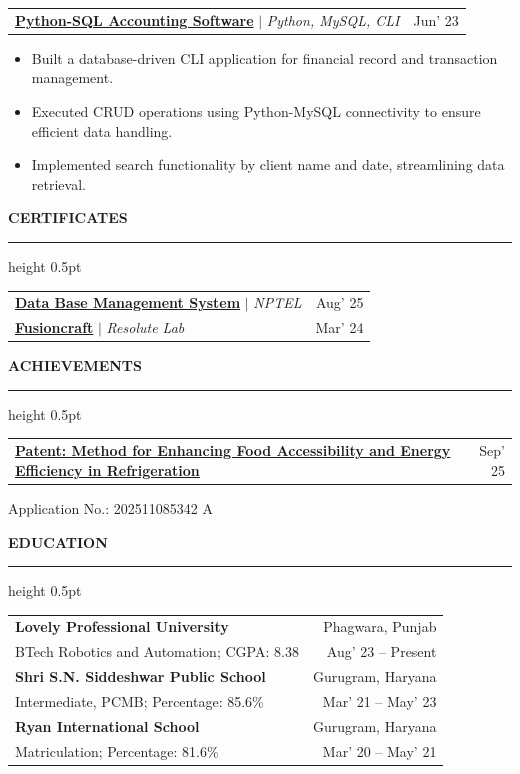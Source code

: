 \documentclass[10pt,a4paper]{article}
\newcommand{\resumeheading}[1]{
    \vspace{8pt}
    {\large\textbf{\color{resblue} #1}}
    \vspace{1pt}
    {\color{resblue}\hrule height 0.5pt}
    \vspace{4pt}
}
\begin{document}
\vspace{6pt}
\begin{tabularx}{\textwidth}{@{}X r@{}}
\textbf{\color{resblue} \href{https://github.com/som-anshu/python-mysql-accounting}{Python-SQL Accounting Software}} $|$ \textit{Python, MySQL, CLI} & Jun' 23
\end{tabularx}
\begin{itemize}[leftmargin=1.5em, itemsep=2pt, parsep=2pt, topsep=3pt]
    \item Built a database-driven CLI application for financial record and transaction management.
    \item Executed CRUD operations using Python-MySQL connectivity to ensure efficient data handling.
    \item Implemented search functionality by client name and date, streamlining data retrieval.
\end{itemize}

\resumeheading{CERTIFICATES}
\vspace{4pt}
\begin{tabularx}{\textwidth}{@{}X r@{}}
\textbf{\color{resblue} \href{https://drive.google.com/file/d/1cPZTNh-I-6y_1j0XR1dyLbr4Padv7GvN/view?usp=drive_link}{Data Base Management System}} $|$ \textit{NPTEL} & Aug' 25 \\ [4pt]
\textbf{\color{resblue} \href{https://drive.google.com/file/d/16txdJfMjoQ9aB_c2yHVEDFoT7vu3QOEp/view?usp=drive_link}{Fusioncraft}} $|$ \textit{Resolute Lab} & Mar' 24
\end{tabularx}

\resumeheading{ACHIEVEMENTS}
\begin{tabularx}{\textwidth}{@{}X r@{}}
\textbf{\color{resblue} \href{https://drive.google.com/file/d/1PNy_NGYBe1Dt2zS2FtCkgpTa2ak69WHM/view?usp=drive_link}{Patent: Method for Enhancing Food Accessibility and Energy Efficiency in Refrigeration}} & Sep' 25 \\
\end{tabularx}
Application No.: 202511085342 A

\resumeheading{EDUCATION}
\vspace{4pt}
\begin{tabularx}{\textwidth}{@{}X r@{}}
\textbf{\color{resblue} Lovely Professional University} & Phagwara, Punjab \\
BTech Robotics and Automation; CGPA: 8.38 & Aug' 23 -- Present \\[6pt]
\textbf{\color{resblue} Shri S.N. Siddeshwar Public School} & Gurugram, Haryana \\
Intermediate, PCMB; Percentage: 85.6\% & Mar' 21 -- May' 23 \\[6pt]
\textbf{\color{resblue} Ryan International School} & Gurugram, Haryana \\
Matriculation; Percentage: 81.6\% & Mar' 20 -- May' 21
\end{tabularx}
\end{document}
